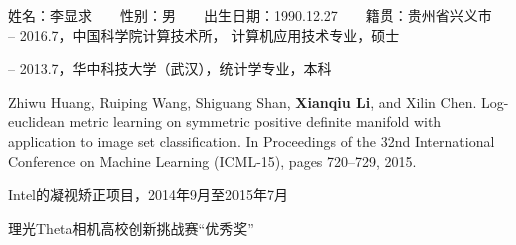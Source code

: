 \begin{resume}

\noindent
姓名：李显求　　性别：男　　出生日期：1990.12.27　　籍贯：贵州省兴义市\\

 -- 2016.7，中国科学院计算技术所， 计算机应用技术专业，硕士

 -- 2013.7，华中科技大学（武汉），统计学专业，本科\\


  \begin{enumerate}[{[}1{]}]
  \item Zhiwu Huang, Ruiping Wang, Shiguang Shan, \textbf{Xianqiu Li}, and Xilin Chen. Log-euclidean metric learning on symmetric positive definite manifold with application to image set classification. In Proceedings of the 32nd International Conference on Machine Learning (ICML-15), pages 720–729,
2015.
  \end{enumerate}

  \begin{enumerate}[{[}1{]}]
  \item Intel的凝视矫正项目，2014年9月至2015年7月
  \end{enumerate}

  \begin{enumerate}[{[}1{]}]
  \item 理光Theta相机高校创新挑战赛“优秀奖”
  \end{enumerate}
\end{resume}

